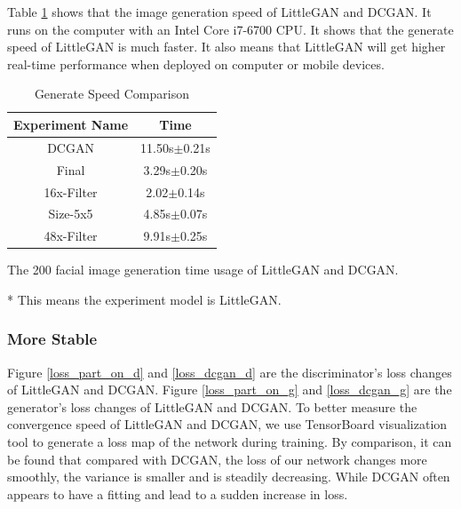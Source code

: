 Table \ref{result_speed} shows that the image generation speed of LittleGAN and DCGAN.
It runs on the computer with an Intel Core i7-6700 CPU.
It shows that the generate speed of LittleGAN is much faster.
It also means that LittleGAN will get higher real-time performance when deployed on computer or mobile devices.

\begin{table}
    \caption{Generate Speed Comparison}
    \label{result_speed}
    \centering
    \begin{threeparttable}
        \begin{tabular}{c|c}
            \hline
            Experiment Name & Time       \\ \hline
            DCGAN        &  11.50s$\pm$0.21s\\
            Final\tnote{*}        &  3.29s$\pm$0.20s\\
            16x-Filter\tnote{*}        & 2.02$\pm$0.14s \\
            Size-5x5\tnote{*}        &  4.85s$\pm$0.07s\\
            48x-Filter\tnote{*}        & 9.91s$\pm$0.25s  \\ \hline
        \end{tabular}
        \begin{tablenotes}
            \item The 200 facial image generation time usage of LittleGAN and DCGAN.
            \item[*] This means the experiment model is LittleGAN.
        \end{tablenotes}
    \end{threeparttable}
\end{table}


\subsubsection*{More Stable}
Figure \ref{loss_part_on_d} and \ref{loss_dcgan_d} are the discriminator's loss changes of LittleGAN and DCGAN.
Figure \ref{loss_part_on_g} and \ref{loss_dcgan_g} are the generator's loss changes of LittleGAN and DCGAN.
To better measure the convergence speed of LittleGAN and DCGAN,
    we use TensorBoard visualization tool to generate a loss map of the network during training.
By comparison, it can be found that compared with DCGAN,
    the loss of our network changes more smoothly, the variance is smaller and is steadily decreasing.
While DCGAN often appears to have a fitting and lead to a sudden increase in loss.

